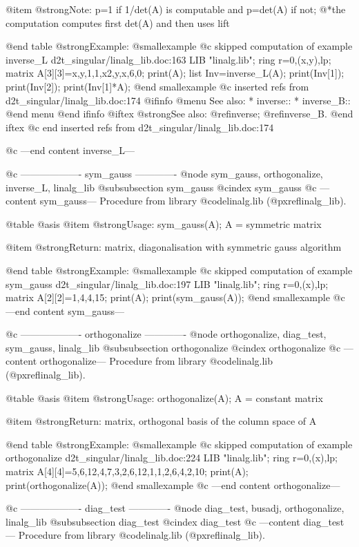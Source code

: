 @item @strong{Note:}
p=1 if 1/det(A) is computable and p=det(A) if not;
@*the computation computes first det(A) and then uses lift

@end table
@strong{Example:}
@smallexample
@c skipped computation of example inverse_L d2t_singular/linalg_lib.doc:163 
LIB "linalg.lib";
ring r=0,(x,y),lp;
matrix A[3][3]=x,y,1,1,x2,y,x,6,0;
print(A);
list Inv=inverse_L(A);
print(Inv[1]);
print(Inv[2]);
print(Inv[1]*A);
@end smallexample
@c inserted refs from d2t_singular/linalg_lib.doc:174
@ifinfo
@menu
See also:
* inverse::
* inverse_B::
@end menu
@end ifinfo
@iftex
@strong{See also:}
@ref{inverse};
@ref{inverse_B}.
@end iftex
@c end inserted refs from d2t_singular/linalg_lib.doc:174

@c ---end content inverse_L---

@c ------------------- sym_gauss -------------
@node sym_gauss, orthogonalize, inverse_L, linalg_lib
@subsubsection sym_gauss
@cindex sym_gauss
@c ---content sym_gauss---
Procedure from library @code{linalg.lib} (@pxref{linalg_lib}).

@table @asis
@item @strong{Usage:}
sym_gauss(A); A = symmetric matrix

@item @strong{Return:}
matrix, diagonalisation with symmetric gauss algorithm

@end table
@strong{Example:}
@smallexample
@c skipped computation of example sym_gauss d2t_singular/linalg_lib.doc:197 
LIB "linalg.lib";
ring r=0,(x),lp;
matrix A[2][2]=1,4,4,15;
print(A);
print(sym_gauss(A));
@end smallexample
@c ---end content sym_gauss---

@c ------------------- orthogonalize -------------
@node orthogonalize, diag_test, sym_gauss, linalg_lib
@subsubsection orthogonalize
@cindex orthogonalize
@c ---content orthogonalize---
Procedure from library @code{linalg.lib} (@pxref{linalg_lib}).

@table @asis
@item @strong{Usage:}
orthogonalize(A); A = constant matrix

@item @strong{Return:}
matrix, orthogonal basis of the column space of A

@end table
@strong{Example:}
@smallexample
@c skipped computation of example orthogonalize d2t_singular/linalg_lib.doc:224 
LIB "linalg.lib";
ring r=0,(x),lp;
matrix A[4][4]=5,6,12,4,7,3,2,6,12,1,1,2,6,4,2,10;
print(A);
print(orthogonalize(A));
@end smallexample
@c ---end content orthogonalize---

@c ------------------- diag_test -------------
@node diag_test, busadj, orthogonalize, linalg_lib
@subsubsection diag_test
@cindex diag_test
@c ---content diag_test---
Procedure from library @code{linalg.lib} (@pxref{linalg_lib}).


